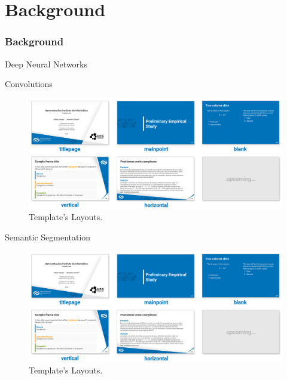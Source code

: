 \section{Background}


\begin{frame}{}
    \frametitle{Background}
\end{frame}


\begin{frame}{Deep Neural Networks}
\end{frame}

\begin{frame}{Convolutions}
    \begin{figure}
        \centering
        \includegraphics[width=.9\textwidth]{readme/layouts.png}
        \caption{Template's Layouts.}
        \label{fig:convolutions}
    \end{figure}
\end{frame}

\begin{frame}{Semantic Segmentation}
    \begin{figure}
        \centering
        \includegraphics[width=.9\textwidth]{readme/layouts.png}
        \caption{Template's Layouts.}
        \label{fig:segmentation}
    \end{figure}
\end{frame}

